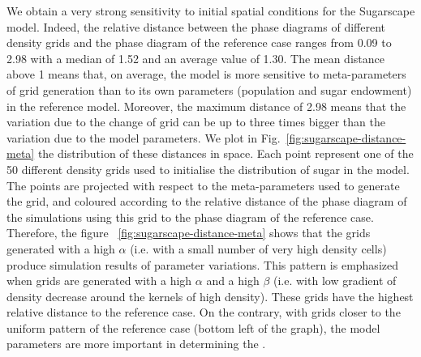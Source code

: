 \documentclass[3p,times,procedia]{elsarticle}
\begin{document}
We obtain a very strong sensitivity to initial spatial conditions for the Sugarscape model. Indeed, the relative distance between the phase diagrams of different density grids and the phase diagram of the reference case ranges from 0.09 to 2.98 with a median of 1.52 and an average value of 1.30. The mean distance above 1 means that, on average, the model is more sensitive to meta-parameters of grid generation than to its own parameters (population and sugar endowment) in the reference model. Moreover, the maximum distance of 2.98 means that the variation due to the change of grid can be up to three times bigger than the variation due to the model parameters. We plot in Fig.~\ref{fig:sugarscape-distance-meta} the distribution of these distances in  space. Each point represent one of the 50 different density grids used to initialise the distribution of sugar in the model. The points are projected with respect to the meta-parameters used to generate the grid, and coloured according to the relative distance of the phase diagram of the simulations using this grid to the phase diagram of the reference case. Therefore, the figure ~\ref{fig:sugarscape-distance-meta} shows that the grids generated with a high $\alpha$ (i.e. with a small number of very high density cells) produce simulation results  of parameter variations. This pattern is emphasized when grids are generated with a high $\alpha$ and a high $\beta$ (i.e. with low gradient of density decrease around the kernels of high density). These grids have the highest relative distance to the reference case. On the contrary, with grids closer to the uniform pattern of the reference case (bottom left of the graph), the model parameters are more important in determining the . 
\end{document}
